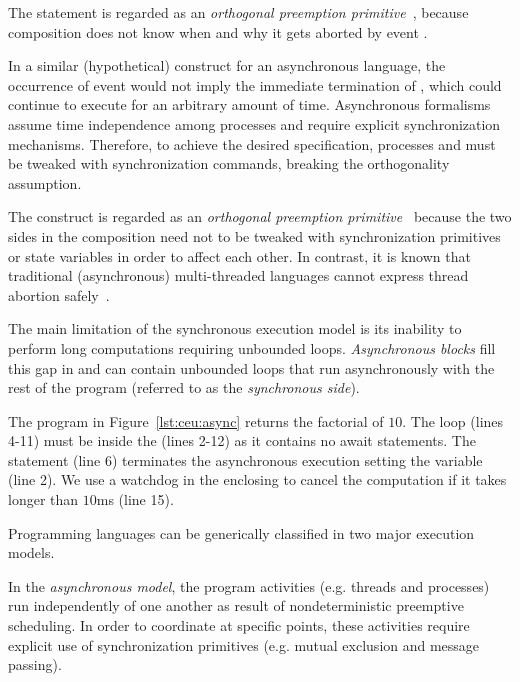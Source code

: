 
The  statement is regarded as an \emph{orthogonal preemption 
primitive}~\cite{esterel.preemption}, because composition  does not 
know when and why it gets aborted by event .

In a similar (hypothetical) construct for an asynchronous language, the 
occurrence of event  would not imply the immediate termination of 
, which could continue to execute for an arbitrary amount of time.
Asynchronous formalisms assume time independence among processes and require 
explicit synchronization mechanisms.
Therefore, to achieve the desired specification, processes  and 
 must be tweaked with synchronization commands, breaking the
orthogonality assumption.~\cite{esterel.preemption}


The  construct is regarded as an \emph{orthogonal preemption 
primitive}~\cite{esterel.preemption} because the two sides in the composition 
need not to be tweaked with synchronization primitives or state variables in
order to affect each other.
In contrast, it is known that traditional (asynchronous) multi-threaded 
languages cannot express thread abortion 
safely~\cite{esterel.preemption,sync_async.threadsstop}.


The main limitation of the synchronous execution model is its inability to 
perform long computations requiring unbounded loops.
\emph{Asynchronous blocks} fill this gap in \CEU{} and can contain unbounded 
loops that run asynchronously with the rest of the program (referred to as the 
\emph{synchronous side}).

The program in Figure~\ref{lst:ceu:async} returns the factorial of $10$.
The loop (lines 4-11) must be inside the  (lines 2-12) as it 
contains no await statements.
The  statement (line 6) terminates the asynchronous execution 
setting the variable  (line 2).
We use a watchdog in the enclosing  to cancel the computation if 
it takes longer than $10$ms (line 15).

Programming languages can be generically classified in two major execution 
models.

In the \emph{asynchronous model}, the program activities (e.g. threads and 
processes) run independently of one another as result of nondeterministic 
preemptive scheduling.
In order to coordinate at specific points, these activities require explicit 
use of synchronization primitives (e.g. mutual exclusion and message passing).

